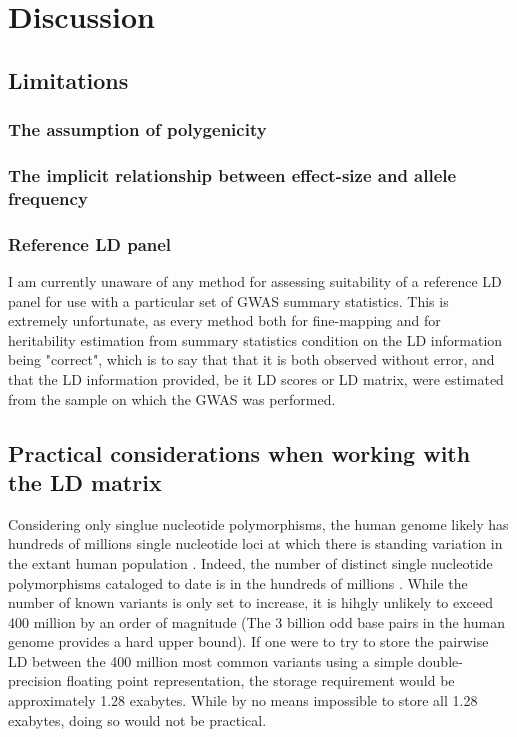 \section{Discussion}\label{sec:orge95691e}

\subsection{Limitations}\label{sec:org2dc1c0d}

\subsubsection{The assumption of polygenicity}\label{sec:orgefbe2e8}

\subsubsection{The implicit relationship between effect-size and allele frequency}\label{sec:org3cb4dd7}

\subsubsection{Reference LD panel}\label{sec:org73e10c3}

I am currently unaware of any method for assessing suitability of a reference LD panel for use with a particular set of GWAS summary statistics.  This is extremely unfortunate, as every 
method both for fine-mapping and for heritability estimation from summary statistics condition on the LD information being "correct", which is to say that that it is both observed without error, and that the LD information provided,
be it LD scores or LD matrix, were estimated from the sample on which the GWAS was performed.  


\subsection{Practical considerations when working with the LD matrix}\label{sec:org5745037}

Considering only singlue nucleotide polymorphisms, the human genome likely has hundreds of millions single nucleotide loci at which there is standing variation in the extant human population \cite{humgenref}.  Indeed, the number of distinct single nucleotide
polymorphisms cataloged to date is in the hundreds of millions \cite{humgenref}.  While the number of known variants is only set to increase, it is hihgly unlikely to exceed 400 million by an order of magnitude (The 3 billion odd base pairs in the human genome provides
a hard upper bound).  If one were to try to store the pairwise LD between the 400 million most common variants using a simple double-precision floating point representation, the storage requirement would be approximately 1.28 exabytes.  While by no means impossible to store
all 1.28 exabytes, doing so would not be practical.  

